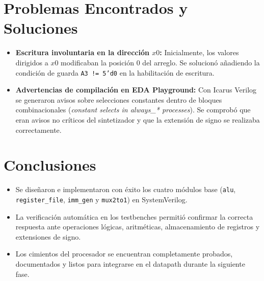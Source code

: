 \documentclass[12pt,a4paper]{article}
\begin{document}
\section{Problemas Encontrados y Soluciones}
\begin{itemize}
    \item \textbf{Escritura involuntaria en la dirección $x0$:} Inicialmente, los valores dirigidos a $x0$ modificaban la posición 0 del arreglo. Se solucionó añadiendo la condición de guarda \texttt{A3 != 5'd0} en la habilitación de escritura.
    \item \textbf{Advertencias de compilación en EDA Playground:} Con Icarus Verilog se generaron avisos sobre selecciones constantes dentro de bloques combinacionales (\textit{constant selects in always\_* processes}). Se comprobó que eran avisos no críticos del sintetizador y que la extensión de signo se realizaba correctamente.
\end{itemize}

\section{Conclusiones}
\begin{itemize}
    \item Se diseñaron e implementaron con éxito los cuatro módulos base (\texttt{alu}, \texttt{register\_file}, \texttt{imm\_gen} y \texttt{mux2to1}) en SystemVerilog.
    \item La verificación automática en los testbenches permitió confirmar la correcta respuesta ante operaciones lógicas, aritméticas, almacenamiento de registros y extensiones de signo.
    \item Los cimientos del procesador se encuentran completamente probados, documentados y listos para integrarse en el datapath durante la siguiente fase.
\end{itemize}

\newpage
\end{document}

